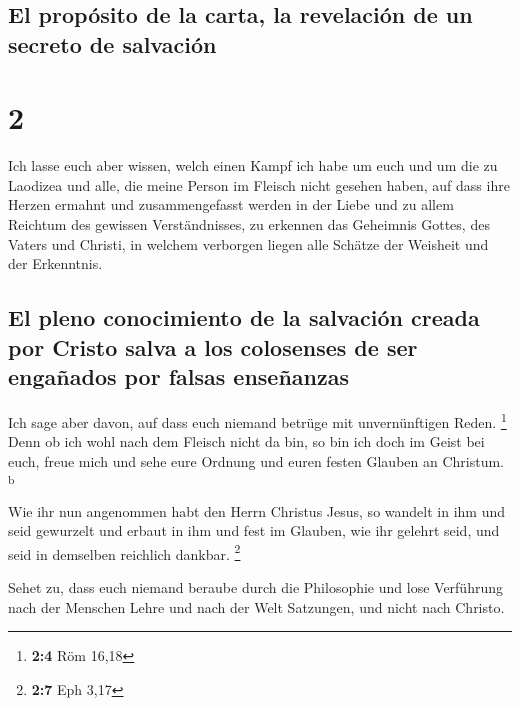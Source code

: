 \hypertarget{el-propuxf3sito-de-la-carta-la-revelaciuxf3n-de-un-secreto-de-salvaciuxf3n}{%
\subsection{El propósito de la carta, la revelación de un secreto de
salvación}\label{el-propuxf3sito-de-la-carta-la-revelaciuxf3n-de-un-secreto-de-salvaciuxf3n}}

\hypertarget{section-1}{%
\section{2}\label{section-1}}

 Ich lasse euch aber wissen, welch einen Kampf ich habe um
euch und um die zu Laodizea und alle, die meine Person im Fleisch nicht
gesehen haben,  auf dass ihre Herzen ermahnt und
zusammengefasst werden in der Liebe und zu allem Reichtum des gewissen
Verständnisses, zu erkennen das Geheimnis Gottes, des Vaters und
Christi,  in welchem verborgen liegen alle Schätze der
Weisheit und der Erkenntnis.

\hypertarget{el-pleno-conocimiento-de-la-salvaciuxf3n-creada-por-cristo-salva-a-los-colosenses-de-ser-engauxf1ados-por-falsas-enseuxf1anzas}{%
\subsection{El pleno conocimiento de la salvación creada por Cristo
salva a los colosenses de ser engañados por falsas
enseñanzas}\label{el-pleno-conocimiento-de-la-salvaciuxf3n-creada-por-cristo-salva-a-los-colosenses-de-ser-engauxf1ados-por-falsas-enseuxf1anzas}}

 Ich sage aber davon, auf dass euch niemand betrüge mit
unvernünftigen Reden. \footnote{\textbf{2:4} Röm 16,18} 
Denn ob ich wohl nach dem Fleisch nicht da bin, so bin ich doch im Geist
bei euch, freue mich und sehe eure Ordnung und euren festen Glauben an
Christum. \textsuperscript{b}

 Wie ihr nun angenommen habt den Herrn Christus Jesus, so
wandelt in ihm  und seid gewurzelt und erbaut in ihm und
fest im Glauben, wie ihr gelehrt seid, und seid in demselben reichlich
dankbar. \footnote{\textbf{2:7} Eph 3,17}

 Sehet zu, dass euch niemand beraube durch die Philosophie
und lose Verführung nach der Menschen Lehre und nach der Welt Satzungen,
und nicht nach Christo.

